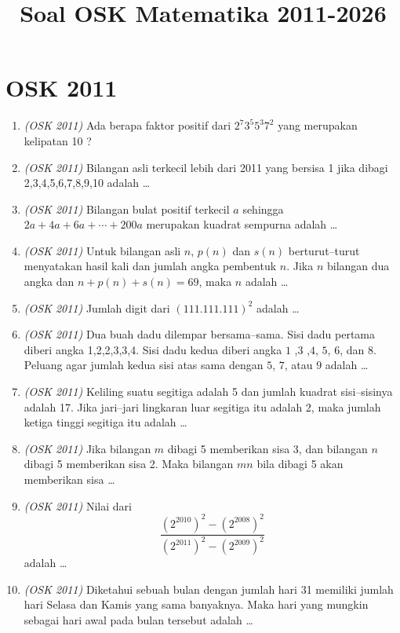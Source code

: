 \documentclass[11pt]{scrartcl}
\begin{document}
\title{Soal OSK Matematika 2011-2026}
\date{}

\maketitle

\section{OSK 2011}
\begin{enumerate}
\item \textit{(OSK 2011)} Ada berapa faktor positif dari $2^7 3^5 5^3 7^2$ yang merupakan kelipatan 10 ?
\item \textit{(OSK 2011)} Bilangan asli terkecil lebih dari 2011 yang bersisa 1 jika dibagi 2,3,4,5,6,7,8,9,10 adalah \dots
\item \textit{(OSK 2011)} Bilangan bulat positif terkecil $a$ sehingga $2a + 4a + 6a + \cdots + 200a$ merupakan kuadrat sempurna adalah \dots
\item \textit{(OSK 2011)} Untuk bilangan asli $n$, $p(n)$ dan $s(n)$ berturut–turut menyatakan hasil kali dan jumlah angka pembentuk $n$. Jika $n$ bilangan dua angka dan $n + p(n) + s(n) = 69$, maka $n$ adalah \dots
\item \textit{(OSK 2011)} Jumlah digit dari $(111.111.111)^2$ adalah \dots
\item \textit{(OSK 2011)} Dua buah dadu dilempar bersama–sama. Sisi dadu pertama diberi angka 1,2,2,3,3,4. Sisi dadu kedua diberi angka $1$ ,$3$ ,$4$, $5$, $6$, dan $8$. Peluang agar jumlah kedua sisi atas sama dengan $5$, $7$, atau $9$ adalah \dots

\item \textit{(OSK 2011)} Keliling suatu segitiga adalah 5 dan jumlah kuadrat sisi–sisinya adalah 17. Jika jari–jari lingkaran luar segitiga itu adalah 2, maka jumlah ketiga tinggi segitiga itu adalah \dots

\item \textit{(OSK 2011)} Jika bilangan $m$ dibagi 5 memberikan sisa 3, dan bilangan $n$ dibagi 5 memberikan sisa 2. Maka bilangan $mn$ bila dibagi 5 akan memberikan sisa \dots
\item \textit{(OSK 2011)} Nilai dari  
\[
\frac{(2^{2010})^2 - (2^{2008})^2}{(2^{2011})^2 - (2^{2009})^2}
\]
adalah \dots
\item \textit{(OSK 2011)} Diketahui sebuah bulan dengan jumlah hari 31 memiliki jumlah hari Selasa dan Kamis yang sama banyaknya. Maka hari yang mungkin sebagai hari awal pada bulan tersebut adalah \dots


\end{enumerate}
\end{document}
